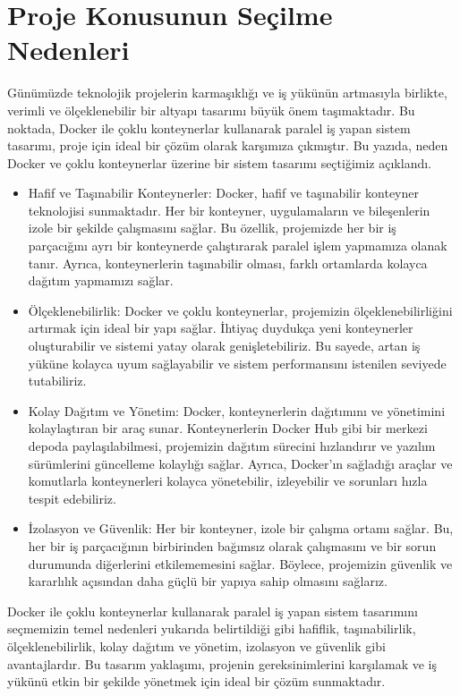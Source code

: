 \section{Proje Konusunun Seçilme Nedenleri}
Günümüzde teknolojik projelerin karmaşıklığı ve iş yükünün artmasıyla birlikte, verimli ve ölçeklenebilir bir altyapı tasarımı büyük önem taşımaktadır.
 Bu noktada, Docker ile çoklu konteynerlar kullanarak paralel iş yapan sistem tasarımı, proje için ideal bir çözüm olarak karşımıza çıkmıştır.
  Bu yazıda, neden Docker ve çoklu konteynerlar üzerine bir sistem tasarımı seçtiğimiz açıklandı.\\
\begin{itemize}
   \item Hafif ve Taşınabilir Konteynerler:
    Docker, hafif ve taşınabilir konteyner teknolojisi sunmaktadır. Her bir konteyner, uygulamaların ve bileşenlerin izole bir şekilde çalışmasını sağlar. Bu özellik, projemizde her bir iş parçacığını ayrı bir konteynerde çalıştırarak paralel işlem yapmamıza olanak tanır. Ayrıca, konteynerlerin taşınabilir olması, farklı ortamlarda kolayca dağıtım yapmamızı sağlar.
    
   \item  Ölçeklenebilirlik:
    Docker ve çoklu konteynerlar, projemizin ölçeklenebilirliğini artırmak için ideal bir yapı sağlar. İhtiyaç duydukça yeni konteynerler oluşturabilir ve sistemi yatay olarak genişletebiliriz. Bu sayede, artan iş yüküne kolayca uyum sağlayabilir ve sistem performansını istenilen seviyede tutabiliriz.
    
   \item Kolay Dağıtım ve Yönetim:
    Docker, konteynerlerin dağıtımını ve yönetimini kolaylaştıran bir araç sunar. Konteynerlerin Docker Hub gibi bir merkezi depoda paylaşılabilmesi, projemizin dağıtım sürecini hızlandırır ve yazılım sürümlerini güncelleme kolaylığı sağlar. Ayrıca, Docker'ın sağladığı araçlar ve komutlarla konteynerleri kolayca yönetebilir, izleyebilir ve sorunları hızla tespit edebiliriz.
    
   \item İzolasyon ve Güvenlik:
    Her bir konteyner, izole bir çalışma ortamı sağlar. Bu, her bir iş parçacığının birbirinden bağımsız olarak çalışmasını ve bir sorun durumunda diğerlerini etkilememesini sağlar. Böylece, projemizin güvenlik ve kararlılık açısından daha güçlü bir yapıya sahip olmasını sağlarız.
    \end{itemize}
    Docker ile çoklu konteynerlar kullanarak paralel iş yapan sistem tasarımını seçmemizin temel nedenleri yukarıda belirtildiği gibi hafiflik, taşınabilirlik, ölçeklenebilirlik, kolay dağıtım ve yönetim, izolasyon ve güvenlik gibi avantajlardır. Bu tasarım yaklaşımı, projenin gereksinimlerini karşılamak ve iş yükünü etkin bir şekilde yönetmek için ideal bir çözüm sunmaktadır.

